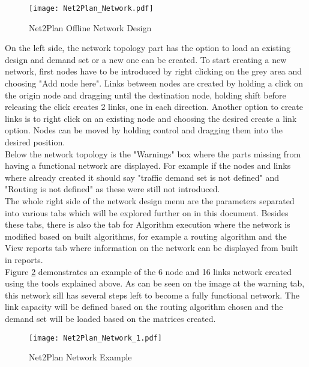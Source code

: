 	\begin{figure}[h!]
		\centering
		\texttt{[image: Net2Plan\_Network.pdf]}
		\caption{Net2Plan Offline Network Design}
		\label{Net2Plan_Network}
	\end{figure}
	
	On the left side, the network topology part has the option to load an existing design and demand set or a new one can be created. To start creating a new network, first nodes have to be introduced by right clicking on the grey area and choosing "Add node here". Links between nodes are created by holding a click on the origin node and dragging until the destination node, holding shift before releasing the click creates 2 links, one in each direction. Another option to create links is to right click on an existing node and choosing the desired create a link option. Nodes can be moved by holding control and dragging them into the desired position.\\
	
	Below the network topology is the "Warnings" box where the parts missing from having a functional network are displayed. For example if the nodes and links where already created it should say "traffic demand set is not defined" and "Routing is not defined" as these were still not introduced.\\
	
	The whole right side of the network design menu are the parameters separated into various tabs which will be explored further on in this document. Besides these tabs, there is also the tab for Algorithm execution where the network is modified based on built algorithms, for example a routing algorithm and the View reports tab where information on the network can be displayed from built in reports. \\

	Figure \ref{Net2Plan_Network_1} demonstrates an example of the 6 node and 16 links network created using the tools explained above. As can be seen on the image at the warning tab, this network sill has several steps left to become a fully functional network. The link capacity will be defined based on the routing algorithm chosen and the demand set will be loaded based on the matrices created. \\
		
	\pagebreak
	\begin{figure}[h!]
		\centering
		\texttt{[image: Net2Plan\_Network\_1.pdf]}
		\caption{Net2Plan Network Example}
		\label{Net2Plan_Network_1}
	\end{figure}

